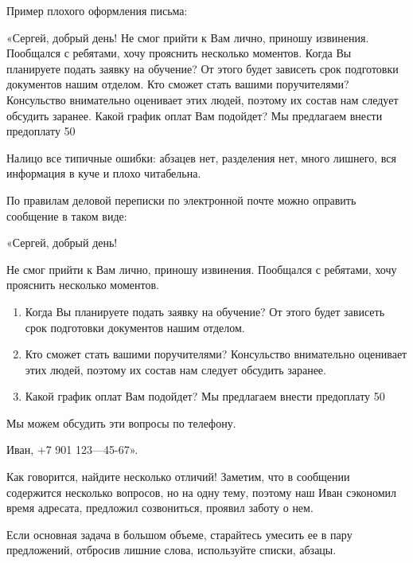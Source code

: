 Пример плохого оформления письма:

«Сергей, добрый день! Не смог прийти к Вам лично, приношу извинения. Пообщался с ребятами, хочу прояснить несколько моментов. Когда Вы планируете подать заявку на обучение? От этого будет зависеть срок подготовки документов нашим отделом. Кто сможет стать вашими поручителями? Консульство внимательно оценивает этих людей, поэтому их состав нам следует обсудить заранее. Какой график оплат Вам подойдет? Мы предлагаем внести предоплату 50%

Налицо все типичные ошибки: абзацев нет, разделения нет, много лишнего, вся информация в куче и плохо читабельна.

По правилам деловой переписки по электронной почте можно оправить сообщение в таком виде:

«Сергей, добрый день!

Не смог прийти к Вам лично, приношу извинения. Пообщался с ребятами, хочу прояснить несколько моментов.
\begin{enumerate}
    \item Когда Вы планируете подать заявку на обучение? От этого будет зависеть срок подготовки документов нашим отделом.
    \item Кто сможет стать вашими поручителями? Консульство внимательно оценивает этих людей, поэтому их состав нам следует обсудить заранее.
    \item Какой график оплат Вам подойдет? Мы предлагаем внести предоплату 50%
\end{enumerate}

Мы можем обсудить эти вопросы по телефону.

Иван, +7 901 123—45-67».

Как говорится, найдите несколько отличий! Заметим, что в сообщении содержится несколько вопросов, но на одну тему, поэтому наш Иван сэкономил время адресата, предложил созвониться, проявил заботу о нем.

Если основная задача в большом объеме, старайтесь умесить ее в пару предложений, отбросив лишние слова, используйте списки, абзацы.

